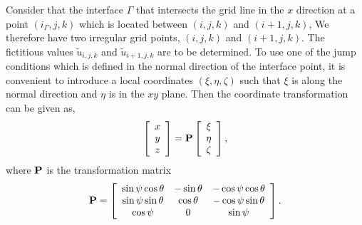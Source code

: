 Consider that the interface $\Gamma$ that intersects the grid line in the $x$ direction at a point $(i_\Gamma, j,k)$ which is located between $(i,j,k)$ and $(i+1,j,k)$, We therefore have two irregular grid points, $(i,j,k)$ and $(i+1,j,k)$. The fictitious values $\tilde{u}_{i,j,k}$ and $\tilde{u}_{i+1,j,k}$ are to be determined. To use one of the jump conditions which is defined in the normal direction of the interface point, it is convenient to introduce a local coordinates $(\xi,\eta,\zeta)$ such that $\xi$ is along the normal direction and $\eta $ is in the $xy$ plane. Then the coordinate transformation can be given as, 
\begin{align}
  \left[
            \begin{array}{c}
             x\\
             y\\
             z
       \end{array}\right] =\bf{P}\left[\begin{array}{c}
            \xi\\
            \eta\\
            \zeta
     \end{array}\right],\label{eqtran1}
\end{align}
where $\bf{P}$ is the transformation matrix
\begin{align}
    \bf{P}=\left[\begin{array}{ccc}
                 \sin\psi\cos\theta  &-\sin\theta   & -\cos\psi\cos\theta \\
                \sin\psi\sin\theta   & \cos\theta   & -\cos\psi\sin\theta \\
                  \cos\psi 			 & 0 			& \sin\psi
                 \end{array}\right]. \label{eqtran2}
\end{align}
